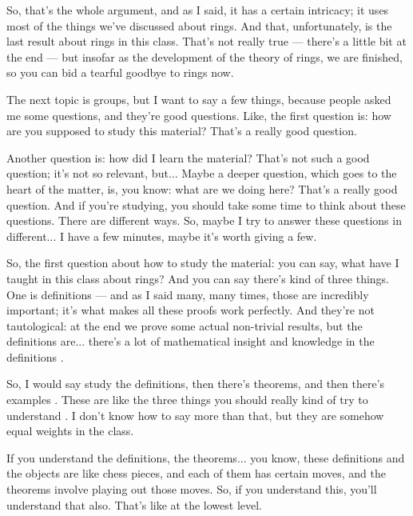 \begin{speech}[00:39:17 - 00:40:59]
So, that's the whole argument, and as I said, it has a certain intricacy; it uses most of the things we've discussed about rings. And that, unfortunately, is the last result about rings in this class. That's not really true --- there's a little bit at the end --- but insofar as the development of the theory of rings, we are finished, so you can bid a tearful goodbye to rings now.

The next topic is groups, but I want to say a few things, because people asked me some questions, and they're good questions. Like, the first question is: how are you supposed to study this material? That's a really good question. 

Another question is: how did I learn the material? That's not such a good question; it's not so relevant, but... Maybe a deeper question, which goes to the heart of the matter, is, you know: what are we doing here? That's a really good question. And if you're studying, you should take some time to think about these questions. There are different ways. So, maybe I try to answer these questions in different... I have a few minutes, maybe it's worth giving a few.

So, the first question about how to study the material: you can say, what have I taught in this class about rings? And you can say there's kind of three things. One is definitions --- and as I said many, many times, those are incredibly important; it's what makes all these proofs work perfectly. And they're not tautological: at the end we prove some actual non-trivial results, but the definitions are... there's a lot of mathematical insight and knowledge in the definitions .
\end{speech}

\begin{speech}[00:40:59 - 00:41:36]
So, I would say study the definitions, then there's theorems, and then there's examples . These are like the three things you should really kind of try to understand . I don't know how to say more than that, but they are somehow equal weights in the class.

If you understand the definitions, the theorems... you know, these definitions and the objects are like chess pieces, and each of them has certain moves, and the theorems involve playing out those moves. So, if you understand this, you'll understand that also. That's like at the lowest level.
\end{speech}

